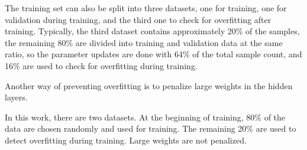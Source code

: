 The training set can also be split into three datasets, one for training, one for validation during training, and the third one to check for overfitting after training. Typically, the third dataset contains approximately 20\% of the samples, the remaining 80\% are divided into training and validation data at the same ratio, so the parameter updates are done with 64\% of the total sample count, and 16\% are used to check for overfitting during training.

Another way of preventing overfitting is to penalize large weights in the hidden layers.

In this work, there are two datasets. At the beginning of training, 80\% of the data are chosen randomly and used for training. The remaining 20\% are used to detect overfitting during training. Large weights are not penalized.